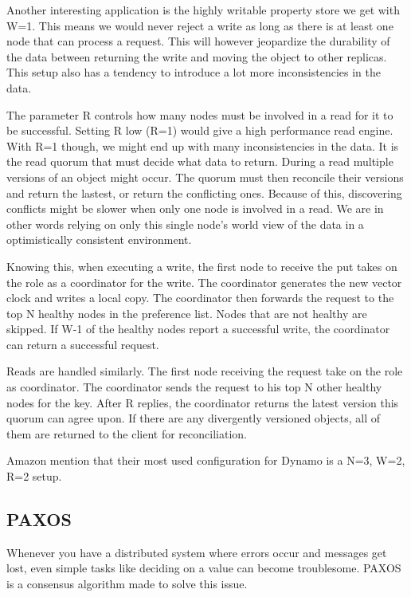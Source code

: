 Another interesting application is the highly writable property store we get with W=1. This means we would never reject a write as long as there is at least one node that can process a request. This will however jeopardize the durability of the data between returning the write and moving the object to other replicas. This setup also has a tendency to introduce a lot more inconsistencies in the data\cite{dynamo}.

The parameter R controls how many nodes must be involved in a read for it to be successful. Setting R low (R=1) would give a high performance read engine. With R=1 though, we might end up with many inconsistencies in the data. It is the read quorum that must decide what data to return. During a read multiple versions of an object might occur. The quorum must then reconcile their versions and return the lastest, or return the conflicting ones.
Because of this, discovering conflicts might be slower when only one node is involved in a read. We are in other words relying on only this single node's world view of the data in a optimistically consistent environment.

Knowing this, when executing a write, the first node to receive the put takes on the role as a coordinator for the write. The coordinator generates the new vector clock and writes a local copy. The coordinator then forwards the request to the top N healthy nodes in the preference list. Nodes that are not healthy are skipped. If W-1 of the healthy nodes report a successful write, the coordinator can return a successful request. 

Reads are handled similarly. The first node receiving the request take on the role as coordinator. The coordinator sends the request to his top N other healthy nodes for the key. After R replies, the coordinator returns the latest version this quorum can agree upon. If there are any divergently versioned objects, all of them are returned to the client for reconciliation.

Amazon\cite{dynamo} mention that their most used configuration for Dynamo is a N=3, W=2, R=2 setup.

\subsection{PAXOS}
Whenever you have a distributed system where errors occur and messages get lost, even simple tasks like deciding on a value can become troublesome. PAXOS is a consensus algorithm made to solve this issue. 

